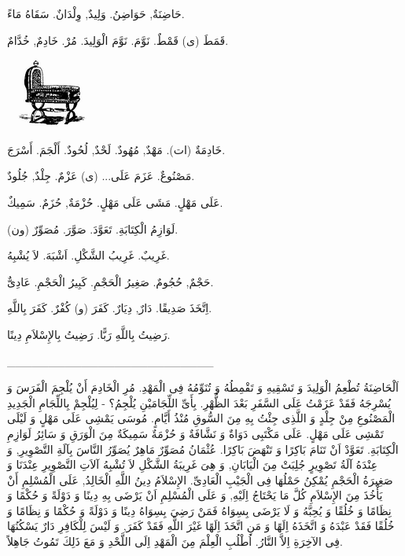 \documentclass[a5paper]{article}
\begin{document}
حَاضِنَةٌ, حَوَاضِنُ. وَلِيدٌ, وِلْدَانٌ. سَقَاهُ مَاءً. 

قَمَطَ (ى) قَمْطٌ. نَوَّمَ. نَوَّمَ الْوَلِيدَ. مُرْ. خَادِمٌ, خُدَّامٌ.

\  \includegraphics[width=0.9898in,height=0.9063in]{images/MuhammadBagauddinprettified-img272.png} 

خَادِمَةٌ (ات). مَهْدٌ, مُهُودٌ. لَحْدٌ, لُحُودٌ. أَلْجَمَ. أَسْرَجَ.

مَصْنُوعٌ. عَزَمَ عَلَى... (ى) عَزْمٌ. جِلْدٌ, جُلُودٌ.

عَلَى مَهْلٍ. مَشَى عَلَى مَهْلٍ. حُزْمَةٌ, حُزَمٌ. سَمِيكٌ.

لَوَازِمُ الْكِتَابَةِ. تَعَوَّدَ. صَوَّرَ. مُصَوِّرٌ (ون).

غَرِيبٌ. غَرِيبُ الشَّكْلِ. اَشْبَهَ. لاَ يُشْبِهُ. 

حَجْمٌ, حُجُومٌ. صَغِيرُ الْحَجْمِ. كَبِيرُ الْحَجْمِ. عَادِىٌّ.

اِتَّخَذَ صَدِيقًا. دَارٌ, دِيَارٌ. كَفَرَ (و) كُفْرٌ. كَفَرَ بِاللَّهِ.

رَضِيتُ بِاللَّهِ رَبًّا. رَضِيتُ بِالإِسْلاَمِ دِينًا.

\_\_\_\_\_\_\_\_\_\_\_\_\_\_\_\_\_\_\_\_\_\_\_\_\_

اَلْحَاضِنَةُ تُطْعِمُ الْوَلِيدَ وَ تَسْقِيهِ وَ تَقْمِطُهُ وَ تُنَوِّمُهُ فِى الْمَهْدِ. مُرِ الْخَادِمَ أَنْ يُلْجِمَ الْفَرَسَ وَ يُسْرِجَهُ فَقَدْ عَزَمْتُ عَلَى السَّفَرِ بَعْدَ الظُّهْرِ. بِأَىِّ اللِّجَامَيْنِ يُلْجِمُ؟ - لِيُلْجِمْ بِاللِّجَامِ الْجَدِيدِ الْمَصْنُوعِ مِنْ جِلْدٍ وَ اللَّذِى جِئْتُ بِهِ مِنَ السُّوقِ مُنْذُ أَيَّامٍ. مُوسَى يَمْشِى عَلَى مَهْلٍ وَ لَيْلَى تَمْشِى عَلَى مَهْلٍ. عَلَى مَكْتَبِى دَوَاةٌ وَ نَشَّافَةٌ وَ حُزْمَةٌ سَمِيكَةٌ مِنَ الْوَرَقِ وَ سَائِرُ لَوَازِمِ الْكِتَابَةِ. تَعَوَّدْ اَنْ تَنَامَ بَاكِرًا وَ تَنْهَضَ بَاكِرًا. عُثْمَانُ مُصَوِّرٌ مَاهِرٌ يُصَوِّرُ النَّاسَ بِآلَةِ التَّصْوِيرِ, وَ عِنْدَهُ آلَةُ تَصْوِيرٍ جُلِبَتْ مِنَ الْيَابَانِ, وَ هِىَ غَرِيبَةُ الشَّكْلِ لاَ تُشْبِهُ آلاَتِ التَّصْوِيرِ عِنْدَنَا وَ صَغِيرَةُ الْحَجْمِ يُمْكِنُ حَمْلُهَا فِى الْجَيْبِ الْعَادِىِّ. الإِسْلاَمُ دِينُ اللَّهِ الْخَالِدُ, عَلَى الْمُسْلِمِ أَنْ يَأْخُذَ مِنَ الإِسْلاَمِ كُلَّ مَا يَحْتَاجُ اِلَيْهِ, وَ عَلَى الْمُسْلِمِ اَنْ يَرْضَى بِهِ دِينًا وَ دَوْلَةً وَ حُكْمًا وَ نِظَامًا وَ خُلُقًا وَ يُحِبَّهُ وَ لَا يَرْضَى بِسِوَاهُ فَمَنْ رَضِيَ بِسِوَاهُ دِينًا وَ دَوْلَةً وَ حُكْمًا وَ نِظَامًا وَ خُلُقًا فَقَدْ عَبْدَهُ وَ اتَّخَذَهُ اِلَهًا وَ مَنِ اتَّخَذَ اِلَهًا غَيْرَ اللَّهِ فَقَدْ كَفَرَ, وَ لَيْسَ لِلْكَافِرِ دَارٌ يَسْكُنُهَا فِى الآخِرَةِ اِلاَّ النَّارُ. اُطْلُبِ الْعِلْمَ مِنَ الْمَهْدِ اِلَى اللَّحْدِ وَ مَعَ ذَلِكَ تَمُوتُ جَاهِلاً.
\end{document}
